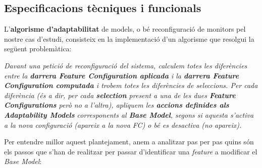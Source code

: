 \subsection{Especificacions tècniques i funcionals}

L'\textbf{algorisme d'adaptabilitat} de models, o bé reconfiguració de monitors pel nostre cas d'estudi, consisteix en la implementació d'un algorisme que resolgui la següent problemàtica:

\begin{center}
\textit{Davant una petició de reconfiguració del sistema, calculem totes les diferències entre la \textbf{darrera Feature Configuration aplicada} i la \textbf{darrera Feature Configuration computada} i trobem totes les diferències de seleccions. Per cada diferència (és a dir, per cada \textbf{selection} present a una de les dues \textbf{Feature Configurations} però no a l'altra), apliquem les \textbf{accions definides als Adaptability Models} corresponents al \textbf{Base Model}, segons si aquesta s'activa a la nova configuració (apareix a la nova FC) o bé es desactiva (no apareix).}
\end{center}

Per entendre millor aquest plantejament, anem a analitzar pas per pas quins són els passos que s'han de realitzar per passar d'identificar una \textit{feature} a modificar el \textit{Base Model}:

